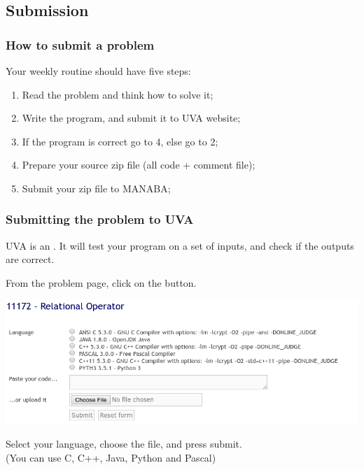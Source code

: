 \documentclass{beamer}
\begin{document}
\subsection{Submission}

\begin{frame}
  \frametitle{How to submit a problem} 
  
  Your weekly routine should have five steps:

  \begin{enumerate}
  \item Read the problem and think how to solve it;
    \medskip
    
  \item Write the program, and submit it to UVA website;
    \medskip
    
  \item If the program is correct go to 4, else go to 2;
    \medskip
    
  \item Prepare your source zip file (all code + comment file);
    \medskip
    
  \item Submit your zip file to MANABA;
  \end{enumerate}
\end{frame}

\begin{frame}
  \frametitle{Submitting the problem to UVA}

  {\small
  UVA is an . It will test your
  program on a set of inputs, and check if the outputs are correct.

  \medskip
  
  From the problem page, click on the  button. 
  
  \begin{center}
    \includegraphics[width=.8\textwidth]{../img/submitpage}
  \end{center}
  
  Select your language, choose the file, and press submit.\\
  (You can use C, C++, Java, Python {\tiny and Pascal})}
\end{frame}
\end{document}
